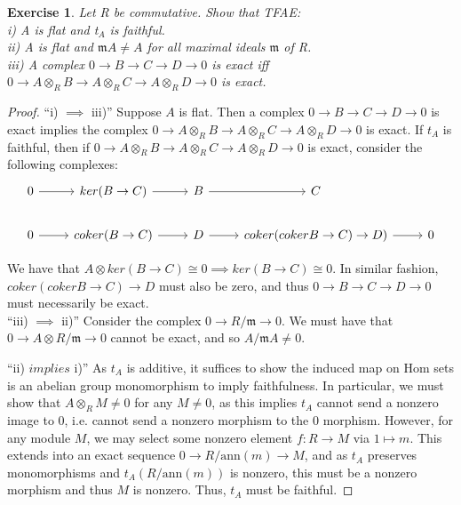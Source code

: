 \documentclass{article}
\newcommand{\Hom}{\text{Hom}}
\newcommand{\fk}[1]{\mathfrak{#1}}
\newtheorem{exercise}{Exercise}
\begin{document}
\begin{exercise}
  Let R be commutative. Show that TFAE: \\
  i) A is flat and t$_{A}$ is faithful. \\
  ii) A is flat and $\fk{m}A \neq A$ for all maximal ideals $\fk{m}$ of R. \\
  iii) A complex $0 \to B \to C \to D \to 0 $ is exact iff $0 \to A \otimes_{R} B \to A \otimes_{R} C \to A \otimes_{R} D \to 0$ is exact. 
\end{exercise}
\begin{proof}
  ``i) $\implies$ iii)'' Suppose $A$ is flat. Then a complex $0 \to B \to C \to D \to 0 $ is exact implies the complex $0 \to A \otimes_{R} B \to A \otimes_{R} C \to A \otimes_{R} D \to 0$ is exact. If $t_{A}$ is faithful, then if $0 \to A \otimes_{R} B \to A \otimes_{R} C \to A \otimes_{R} D \to 0$ is exact, consider the following complexes:
  \[
    \begin{tikzcd}
0 \arrow[r] & ker(B \to C) \arrow[r]    & B \arrow[r] & C                                    &   \\
0 \arrow[r] & coker (B \to C) \arrow[r] & D \arrow[r] & coker(cokerB \to C) \to D) \arrow[r] & 0
\end{tikzcd}
\]

We have that $A \otimes ker(B \to C) \cong 0 \implies ker (B \to C) \cong 0$. In similar fashion, $coker(cokerB \to C) \to D$ must also be zero, and thus $0 \to B \to C \to D \to 0$ must necessarily be exact. \\

``iii) $\implies$ ii)'' Consider the complex $0 \to R/\fk{m} \to 0$. We must have that $0 \to A \otimes R/\fk{m} \to 0$ cannot be exact, and so $A/\fk{m}A \neq 0$. \newpage

``ii) $implies$ i)'' As $t_{A}$ is additive, it suffices to show the induced map on $\Hom$ sets is an abelian group monomorphism to imply faithfulness. In particular, we must show that $A \otimes_{R} M \neq 0$ for any $M \neq 0$, as this implies $t_{A}$ cannot send a nonzero image to 0, i.e. cannot send a nonzero morphism to the $0$ morphism. However, for any module $M$, we may select some nonzero element $f: R \to M$ via $1 \mapsto m$. This extends into an exact sequence $0 \to R/\text{ann}(m) \to M$, and as $t_{A}$ preserves monomorphisms and $t_{A}(R/\text{ann}(m))$ is nonzero, this must be a nonzero morphism and thus $M$ is nonzero. Thus, $t_{A}$ must be faithful.     
\end{proof}
\end{document}
